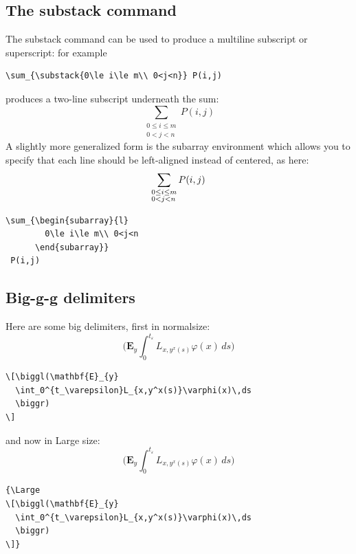 \documentclass{article}
\newcommand{\ntt}{\normalfont\ttfamily}
\newcommand{\cn}[1]{{\protect\ntt\bslash#1}}
\newcommand{\env}[1]{{\protect\ntt#1}}
\theoremstyle{definition}
\theoremstyle{remark}
\begin{document}
\subsection{The \cn{substack} command}

The \cn{substack} command can be used to produce a multiline
subscript or superscript:
for example
\begin{verbatim}
\sum_{\substack{0\le i\le m\\ 0<j<n}} P(i,j)
\end{verbatim}
produces a two-line subscript underneath the sum:
\begin{equation}
\sum_{\substack{0\le i\le m\\ 0<j<n}} P(i,j)
\end{equation}
A slightly more generalized form is the \env{subarray} environment which
allows you to specify that each line should be left-aligned instead of
centered, as here:
\begin{equation}
\sum_{\begin{subarray}{l}
        0\le i\le m\\ 0<j<n
      \end{subarray}}
 P(i,j)
\end{equation}
\begin{verbatim}
\sum_{\begin{subarray}{l}
        0\le i\le m\\ 0<j<n
      \end{subarray}}
 P(i,j)
\end{verbatim}


\subsection{Big-g-g delimiters}
Here are some big delimiters, first in \cn{normalsize}:
\[\biggl(\mathbf{E}_{y}
  \int_0^{t_\varepsilon}L_{x,y^x(s)}\varphi(x)\,ds
  \biggr)
\]
\begin{verbatim}
\[\biggl(\mathbf{E}_{y}
  \int_0^{t_\varepsilon}L_{x,y^x(s)}\varphi(x)\,ds
  \biggr)
\]
\end{verbatim}
and now in \cn{Large} size:
{\Large
\[\biggl(\mathbf{E}_{y}
  \int_0^{t_\varepsilon}L_{x,y^x(s)}\varphi(x)\,ds
  \biggr)
\]}
\begin{verbatim}
{\Large
\[\biggl(\mathbf{E}_{y}
  \int_0^{t_\varepsilon}L_{x,y^x(s)}\varphi(x)\,ds
  \biggr)
\]}
\end{verbatim}

\newpage
\makeatletter
\end{document}
